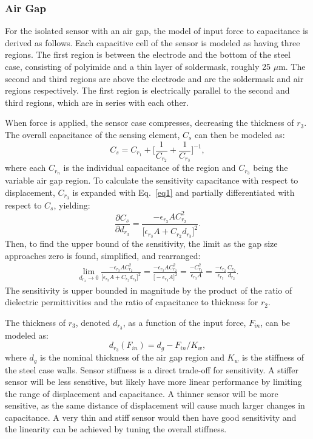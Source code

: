 \subsubsection{Air Gap}

For the isolated sensor with an air gap, the model of input force to capacitance is derived as follows.
Each capacitive cell of the sensor is modeled as having three regions. The first region is between the 
electrode and the bottom of the steel case, consisting of polyimide and 
a thin layer of soldermask, roughly 25 $\mu$m. 
The second and third regions are above the electrode and are the soldermask and air regions respectively. 
The first region is electrically
parallel to the second and third regions, which are in series with each other. 

When force is applied, the sensor case compresses, decreasing the thickness of $r_3$.
The overall capacitance of the sensing element, $C_s$ can then be modeled as:
\begin{equation}
C_{s} = C_{r_1} + \bigg[ \frac{1}{C_{r_2}} + \frac{1}{C_{r_3}} \bigg] ^{-1},
\end{equation}
where each $C_{r_n}$ is the individual capacitance of the region 
and $C_{r_3}$ being the variable air gap region.
To calculate the sensitivity capacitance with respect to displacement, 
$C_{r_3}$ is expanded with Eq.~\ref{eq1} and partially differentiated with respect to $C_s$, yielding:
\begin{equation}
\frac{\partial C_{s}}{\partial d_{r_3}} = 
\frac{-\epsilon_{r_3} A C_{r_2}^2}
{\bigg[ \epsilon_{r_3} A + C_{r_2} d_{r_3} \bigg]^2 } .
\end{equation}
Then, to find the upper bound of the sensitivity, the limit as the gap size approaches zero is found, 
simplified, and rearranged:
\begin{align}
\lim_{d_{r_3} \to 0} 
\frac{-\epsilon_{r_3} A C_{r_2}^2}
{\bigg[ \epsilon_{r_3} A + C_{r_2} d_{r_3} \bigg]^2 } = 
\frac{-\epsilon_{r_3} A C_{r_2}^2}
{\bigg[ -\epsilon_{r_3} A \bigg]^2 } = 
\frac{-C_{r_2}^2}
{ \epsilon_{r_3} A } = 
\frac{-\epsilon_{r_2} }{\epsilon_{r_3} }
\frac{C_{r_2}}{d_{r_2}}.
\end{align}
The sensitivity is upper bounded in magnitude 
by the product of the ratio of dielectric permittivities and the ratio of capacitance to thickness for $r_2$.

The thickness of $r_3$, denoted $d_{r_3}$, as a function of the input force, 
$F_{in}$, can be modeled as:
\begin{equation}
d_{r_3}(F_{in}) = d_g - F_{in} / K_w,
\end{equation}
where $d_g$ is the nominal thickness of the air gap region 
and $K_w$ is the stiffness of the steel case walls.
Sensor stiffness is a direct trade-off for sensitivity. 
A stiffer sensor will be less sensitive, but likely have more linear performance
by limiting the range of displacement and capacitance.
A thinner sensor will be more sensitive, as the same distance of displacement will cause 
much larger changes in capacitance. A very thin and stiff sensor would then 
have good sensitivity and the linearity can be achieved by tuning the overall stiffness.


